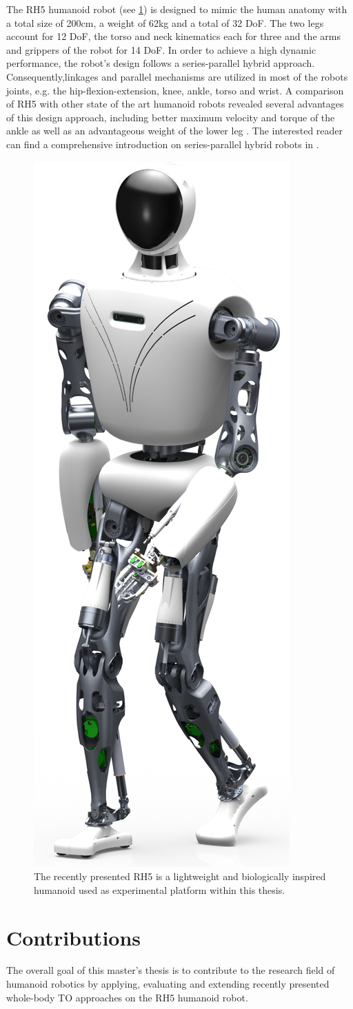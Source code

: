 The RH5 humanoid robot (see \cref{img:rh5_robot}) is designed to mimic the human anatomy with a total size of 200cm, a weight of 62kg and a total of 32 \gls{DoF}. The two legs account for 12 \gls{DoF}, the torso and neck kinematics each for three and the arms and grippers of the robot for 14 \gls{DoF}. In order to achieve a high dynamic performance, the robot's design follows a series-parallel hybrid approach. Consequently,linkages and parallel mechanisms are utilized in most of the robots joints, e.g. the hip-flexion-extension, knee, ankle, torso and wrist. A comparison of RH5 with other state of the art humanoid robots revealed several advantages of this design approach, including better maximum velocity and torque of the ankle as well as an advantageous weight of the lower leg \cite{kumar2020survey}. The interested reader can find a comprehensive introduction on series-parallel hybrid robots in \cite[Ch.2]{kumar2019modular}. 

\begin{figure}[h!]
\centering	
\includegraphics[width=.2\textwidth]{img/rh5_robot}
\caption{The recently presented RH5 is a lightweight and biologically inspired humanoid used as experimental platform within this thesis.}
\label{img:rh5_robot}
\end{figure} 


\section{Contributions}
The overall goal of this master's thesis is to contribute to the research field of humanoid robotics by applying, evaluating and extending recently presented whole-body \gls{TO} approaches on the RH5 humanoid robot. 

